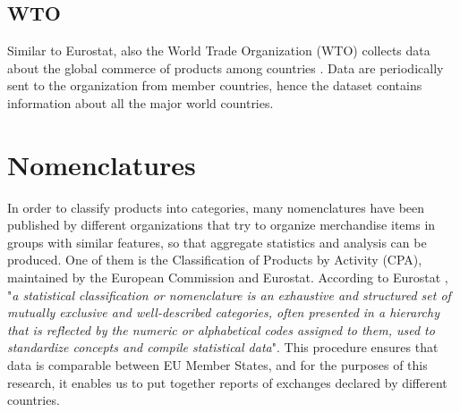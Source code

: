 \subsection{WTO}
Similar to Eurostat, also the World Trade Organization (WTO) collects data about the global commerce of products among countries \cite{wto2022stats}. Data are periodically sent to the organization from member countries, hence the dataset contains information about all the major world countries.

\section{Nomenclatures}

In order to classify products into categories, many nomenclatures have been published by different organizations that try to organize merchandise items in groups with similar features, so that aggregate statistics and analysis can be produced. One of them is the Classification of Products by Activity (CPA), maintained by the European Commission and Eurostat.
According to Eurostat \cite{eurostat2022website}, "\textit{a statistical classification or nomenclature is an exhaustive and structured set of mutually exclusive and well-described categories, often presented in a hierarchy that is reflected by the numeric or alphabetical codes assigned to them, used to standardize concepts and compile statistical data}".
This procedure ensures that data is comparable between EU Member States, and for the purposes of this research, it enables us to put together reports of exchanges declared by different countries.


